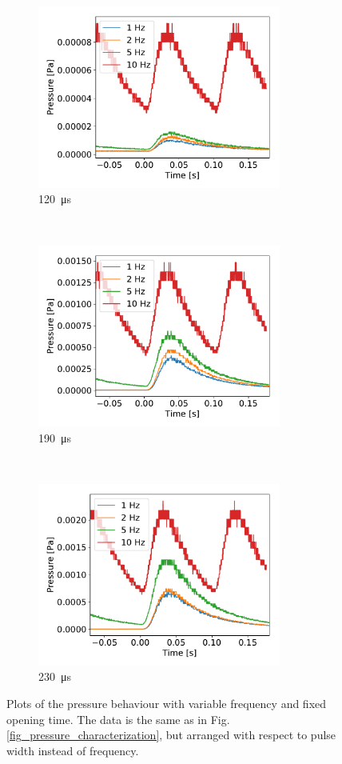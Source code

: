 \documentclass[a4paper,10pt]{article}
\begin{document}
\begin{figure}[H]
  \centering{}
  \begin{subfigure}[t]{0.45 \textwidth}
    \centering
    \includegraphics[height=6cm]{part1_120_width.pdf}
    \caption{\SI{120}{\micro \s}}
  \end{subfigure}
  ~
  \begin{subfigure}[t]{0.45 \textwidth}
    \centering
    \includegraphics[height=6cm]{part1_190_width.pdf}
    \caption{\SI{190}{\micro \s}}
  \end{subfigure}
  ~
  \begin{subfigure}[t]{0.45 \textwidth}
    \centering
    \includegraphics[height=6cm]{part1_230_width.pdf}
    \caption{\SI{230}{\micro \s}}
  \end{subfigure}
  \caption{Plots of the pressure behaviour with variable frequency and fixed opening time. The data is the same as in Fig. \ref{fig_pressure_characterization}, but arranged with respect to pulse width instead of frequency. }
  \label{fig_width_characterization}
\end{figure}
\end{document}
